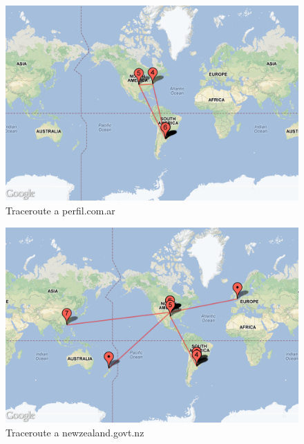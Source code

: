 \begin{figure}[H]
\begin{center}
\includegraphics[width=17cm]{perfil.png}
\end{center}
\caption{Traceroute a perfil.com.ar} \label{figura1}
\end{figure}

\begin{figure}[H]
\begin{center}
\includegraphics[width=17cm]{newzealand.png}
\end{center}
\caption{Traceroute a newzealand.govt.nz} \label{figura1}
\end{figure}
